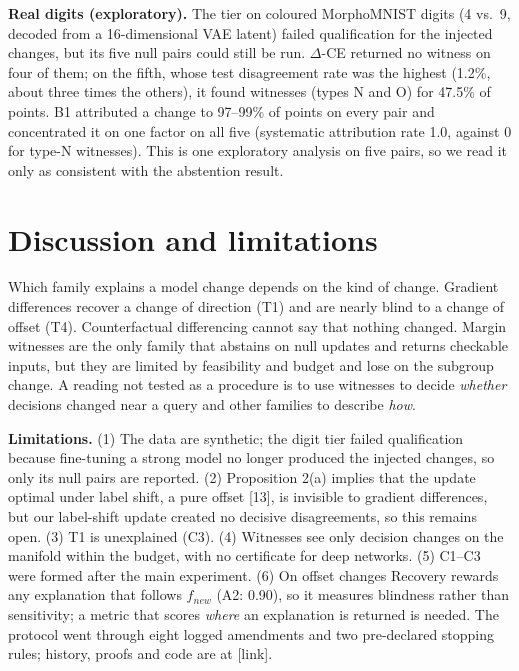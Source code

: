 \documentclass{esannV2}
\begin{document}
\textbf{Real digits (exploratory).} The tier on coloured MorphoMNIST digits (4 vs.\ 9, decoded from a 16-dimensional VAE latent) failed qualification for the injected changes, but its five null pairs could still be run. $\Delta$-CE returned no witness on four of them; on the fifth, whose test disagreement rate was the highest (1.2\%, about three times the others), it found witnesses (types N and O) for 47.5\% of points. B1 attributed a change to 97--99\% of points on every pair and concentrated it on one factor on all five (systematic attribution rate 1.0, against 0 for type-N witnesses). This is one exploratory analysis on five pairs, so we read it only as consistent with the abstention result.

\section{Discussion and limitations}

Which family explains a model change depends on the kind of change. Gradient differences recover a change of direction (T1) and are nearly blind to a change of offset (T4). Counterfactual differencing cannot say that nothing changed. Margin witnesses are the only family that abstains on null updates and returns checkable inputs, but they are limited by feasibility and budget and lose on the subgroup change. A reading not tested as a procedure is to use witnesses to decide \emph{whether} decisions changed near a query and other families to describe \emph{how}.

\textbf{Limitations.} (1) The data are synthetic; the digit tier failed qualification because fine-tuning a strong model no longer produced the injected changes, so only its null pairs are reported. (2) Proposition 2(a) implies that the update optimal under label shift, a pure offset [13], is invisible to gradient differences, but our label-shift update created no decisive disagreements, so this remains open. (3) T1 is unexplained (C3). (4) Witnesses see only decision changes on the manifold within the budget, with no certificate for deep networks. (5) C1--C3 were formed after the main experiment. (6) On offset changes Recovery rewards any explanation that follows $f_{new}$ (A2: 0.90), so it measures blindness rather than sensitivity; a metric that scores \emph{where} an explanation is returned is needed. The protocol went through eight logged amendments and two pre-declared stopping rules; history, proofs and code are at [link].
\end{document}
